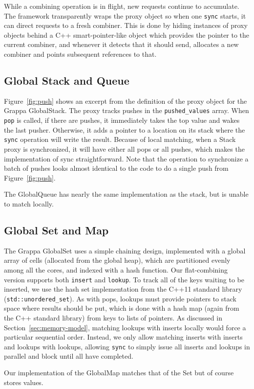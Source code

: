 While a combining operation is in flight, new requests continue to accumulate. The framework transparently wraps the proxy object so when one \texttt{sync} starts, it can direct requests to a fresh combiner.
This is done by hiding instances of proxy objects behind a C++ smart-pointer-like object which provides the pointer to the current combiner, and whenever it detects that it should send, allocates a new combiner and points subsequent references to that.

\subsection{Global Stack and Queue}
Figure~\ref{fig:push} shows an excerpt from the definition of the proxy object for the Grappa GlobalStack. The proxy tracks pushes in the \texttt{pushed\_values} array. When \texttt{pop} is called, if there are pushes, it immediately takes the top value and wakes the last pusher. Otherwise, it adds a pointer to a location on its stack where the \texttt{sync} operation will write the result. Because of local matching, when a Stack proxy is synchronized, it will have either all pops or all pushes, which makes the implementation of sync straightforward. Note that the operation to synchronize a batch of pushes looks almost identical to the code to do a single push from Figure~\ref{fig:push}.

The GlobalQueue has nearly the same implementation as the stack, but is unable to match locally.

\subsection{Global Set and Map}
The Grappa GlobalSet uses a simple chaining design, implemented with a global array of cells (allocated from the global heap), which are partitioned evenly among all the cores, and indexed with a hash function. Our flat-combining version supports both \texttt{insert} and \texttt{lookup}. To track all of the keys waiting to be inserted, we use the hash set implementation from the C++11 standard library (\texttt{std::unordered\_set}). As with pops, lookups must provide pointers to stack space where results should be put, which is done with a hash map (again from the C++ standard library) from keys to lists of pointers. As discussed in Section~\ref{sec:memory-model}, matching lookups with inserts locally would force a particular sequential order. Instead, we only allow matching inserts with inserts and lookups with lookups, allowing \texttt{sync} to simply issue all inserts and lookups in parallel and block until all have completed.

Our implementation of the GlobalMap matches that of the Set but of course stores values.

